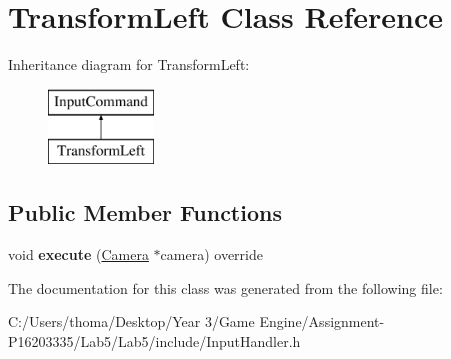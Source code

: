 \hypertarget{class_transform_left}{}\section{Transform\+Left Class Reference}
\label{class_transform_left}
Inheritance diagram for Transform\+Left\+:\begin{figure}[H]
\begin{center}
\leavevmode
\includegraphics[height=2.000000cm]{class_transform_left}
\end{center}
\end{figure}
\subsection*{Public Member Functions}
\begin{DoxyCompactItemize}
\item 
\mbox{\label{class_transform_left_a148cd4d181e65b6ed789de0fa4ea3dec}} 
void {\bfseries execute} (\mbox{\hyperlink{class_camera}{Camera}} $\ast$camera) override
\end{DoxyCompactItemize}


The documentation for this class was generated from the following file\+:\begin{DoxyCompactItemize}
\item 
C\+:/\+Users/thoma/\+Desktop/\+Year 3/\+Game Engine/\+Assignment-\/\+P16203335/\+Lab5/\+Lab5/include/Input\+Handler.\+h\end{DoxyCompactItemize}
